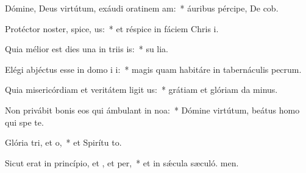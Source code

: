 \item Dómine, Deus virtútum, exáudi oratinem am:~* áuribus pércipe, De cob.
\item Protéctor noster, spice, us:~* et réspice in fáciem Chris i.
\item Quia mélior est dies una in triis is:~* su lia.
\item Elégi abjéctus esse in domo i i:~* magis quam habitáre in tabernáculis pecrum.
\item Quia misericórdiam et veritátem ligit us:~* grátiam et glóriam da minus.
\item Non privábit bonis eos qui ámbulant in noa:~* Dómine virtútum, beátus homo qui spe  te.
\item Glória tri, et o,~* et Spirítu to.
\item Sicut erat in princípio, et , et per,~* et in sǽcula sæculó. men.
